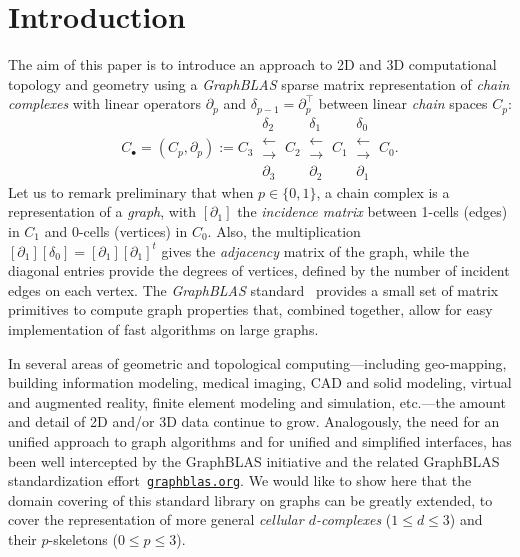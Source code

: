 \section{Introduction}\label{introduction}

The aim of this paper is to introduce an approach to 2D and 3D
computational topology and geometry using a \emph{GraphBLAS} sparse matrix
representation of \emph{chain complexes} with linear operators $\partial_p$ and $\delta_{p-1} = \partial_p^\top$ between linear \emph{chain} spaces $C_p$:
\[ 
C_\bullet = (C_p, \partial_p) := 
C_3 \ 
\substack{
\delta_2 \\
\longleftarrow \\[-1mm]
\longrightarrow \\
\partial_3 
}
\ C_2 \ 
\substack{
\delta_1 \\
\longleftarrow \\[-1mm]
\longrightarrow \\
\partial_2 
}
\ C_1 \ 
\substack{
\delta_0 \\
\longleftarrow \\[-1mm]
\longrightarrow \\
\partial_1 
}
\ C_0 .
\] 
Let us to remark preliminary that when $p\in \{0,1\}$, a chain complex is a representation of a \emph{graph}, with $[\partial_1]$ the \emph{incidence matrix} between 1-cells (edges) in $C_1$ and 0-cells (vertices) in $C_0$. Also, the multiplication $[\partial_1][\delta_0]=[\partial_1][\partial_1]^t$ gives the \emph{adjacency} matrix of the graph, while the diagonal entries provide the degrees of vertices, defined by the number of incident edges on each vertex. The \emph{GraphBLAS} standard~\cite{GraphBLAS:standard} provides a small set of matrix primitives to compute graph properties that, combined together, allow for easy implementation of fast algorithms on large graphs.

In several areas of geometric and topological computing---including
geo-mapping, building information modeling, medical imaging, CAD and
solid modeling, virtual and augmented reality, finite element modeling
and simulation, etc.---the amount and detail of 2D and/or 3D data
continue to grow. Analogously, the need for an unified approach to
graph algorithms and for unified and simplified interfaces, has been
well intercepted by the GraphBLAS initiative and the related GraphBLAS
standardization effort~\href{http://graphblas.org}{\texttt{graphblas.org}}. We would like to show here that the domain
covering of this standard library on graphs can be greatly extended, to cover the
representation of more general \emph{cellular $d$-complexes} ($1\leq d\leq 3$) and their $p$-skeletons ($0\leq p\leq 3$).

